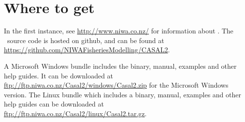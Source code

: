 \section{Where to get \CNAME}\label{sec:installing}

In the first instance, see \url{http://www.niwa.co.nz/} for information about \CNAME . The \CNAME\ source code is hosted on github, and can be found at \url{https://github.com/NIWAFisheriesModelling/CASAL2}.

A Microsoft Windows bundle includes the binary, manual, examples and other help guides. It can be downloaded at \url{ftp://ftp.niwa.co.nz/Casal2/windows/Casal2.zip} for the Microsoft Windows version. The Linux bundle which includes a binary, manual, examples and other help guides can be downloaded at \url{ftp://ftp.niwa.co.nz/Casal2/linux/Casal2.tar.gz}.



